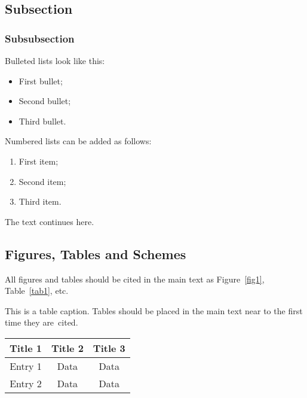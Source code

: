 \documentclass[entropy,article,submit,moreauthors,pdftex]{Definitions/mdpi}
\begin{document}
\subsection{Subsection}
\subsubsection{Subsubsection}

Bulleted lists look like this:
\begin{itemize}
\item	First bullet;
\item	Second bullet;
\item	Third bullet.
\end{itemize}

Numbered lists can be added as follows:
\begin{enumerate}
\item	First item; 
\item	Second item;
\item	Third item.
\end{enumerate}

The text continues here. 

\subsection{Figures, Tables and Schemes}

All figures and tables should be cited in the main text as Figure~\ref{fig1}, Table~\ref{tab1}, etc.


\begin{specialtable}[H] 
\caption{This is a table caption. Tables should be placed in the main text near to the first time they are~cited.\label{tab1}}
\begin{tabular}{ccc}
\toprule
\textbf{Title 1}	& \textbf{Title 2}	& \textbf{Title 3}\\
\midrule
Entry 1		& Data			& Data\\
Entry 2		& Data			& Data\\
\bottomrule
\end{tabular}
\end{specialtable}
\end{document}
